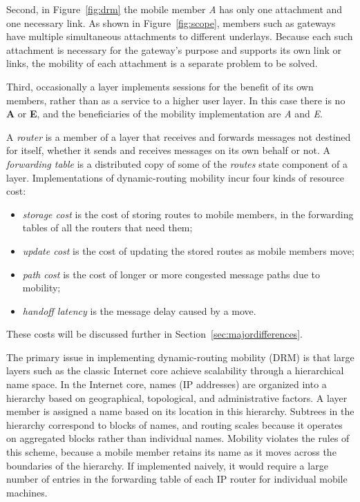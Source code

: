 Second, in Figure~\ref{fig:drm} the mobile member {\it A} has only
one attachment and one necessary link.
As shown in Figure~\ref{fig:scope}, members such as gateways have
multiple simultaneous attachments to different underlays.
Because each such attachment is necessary for the gateway's
purpose and supports its own link or links,
the mobility of each attachment is a separate problem to be solved.

Third, occasionally a layer implements sessions for the benefit of
its own members, rather than as a service to a higher user layer.
In this case there is no {\bf A} or {\bf E}, and the beneficiaries of
the mobility implementation are {\it A} and {\it E}.

A {\it router} is a member of a layer that receives and forwards messages
not destined for itself, whether it sends and receives messages on its
own behalf or not.
A {\it forwarding table} is a distributed copy of some of the
{\it routes} state component of a layer.
Implementations of dynamic-routing mobility incur four kinds of
resource cost:
\begin{itemize}
\item
{\it storage cost} is the cost of storing routes to mobile members,
in the forwarding tables of all the routers that need them;
\item
{\it update cost} is the cost of updating the stored routes as mobile
members move;
\item
{\it path cost} is the cost of longer or more congested message paths
due to mobility;
\item
{\it handoff latency} is the message delay caused by a move.
\end{itemize}
These costs will be discussed further in 
Section~\ref{sec:majordifferences}.

The primary issue in implementing dynamic-routing mobility (DRM) is
that large layers such as the classic Internet core achieve scalability
through a hierarchical name space.
In the Internet core, names (IP addresses) are organized into a
hierarchy based on geographical, topological, and administrative
factors.
A layer member is assigned a name based on its location in this hierarchy.
Subtrees in the hierarchy correspond to blocks of names, and routing
scales because it operates on aggregated
blocks rather than individual names.
Mobility violates the rules of this scheme, because a mobile member
retains its name as it moves across the boundaries of the hierarchy.
If implemented naively, it would require a large number of entries
in the forwarding table of each IP router for individual mobile machines.

